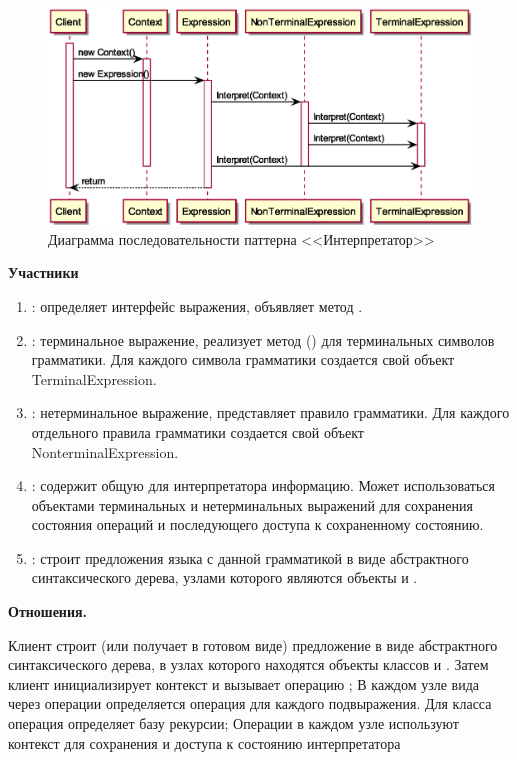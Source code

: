 \documentclass[PI,LAB]{HSEUniversity}
\begin{document}
\begin{figure}[p]
  \centering
  \includegraphics[scale=0.75]{Interpreter_SD.eps}
  \caption{Диаграмма последовательности паттерна <<Интерпретатор>>}
\end{figure}
\clearpage

\textbf{Участники}

\begin{enumerate}
    \item {}: определяет интерфейс выражения, объявляет метод .
    \item {}: терминальное выражение, реализует метод () для терминальных символов грамматики. Для каждого символа грамматики создается свой объект TerminalExpression.
    \item {}: нетерминальное выражение, представляет правило грамматики. Для каждого отдельного правила грамматики создается свой объект NonterminalExpression.
    \item {}: содержит общую для интерпретатора информацию. Может использоваться объектами терминальных и нетерминальных выражений для сохранения состояния операций и последующего доступа к сохраненному состоянию.
    \item {}: строит предложения языка с данной грамматикой в виде абстрактного синтаксического дерева, узлами которого являются объекты  и .
\end{enumerate}

\textbf{Отношения.}

Клиент строит (или получает в готовом виде) предложение в виде абстрактного синтаксического дерева, в узлах которого находятся объекты классов  и . Затем клиент инициализирует контекст и вызывает операцию ;
В каждом узле вида  через операции  определяется операция  для каждого подвыражения. Для класса  операция  определяет базу рекурсии;
Операции  в каждом узле используют контекст для сохранения и доступа к состоянию интерпретатора
\end{document}
